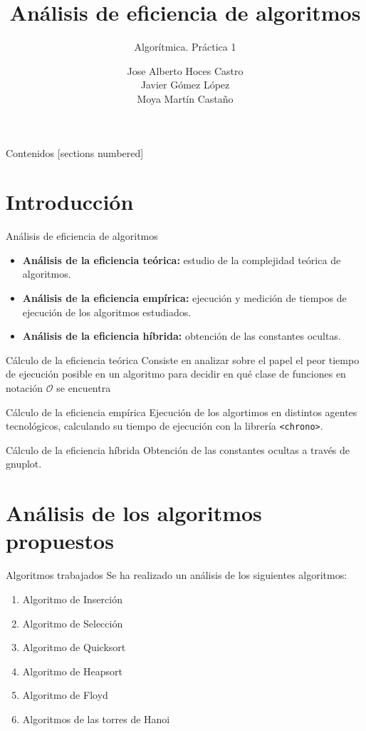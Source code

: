 \documentclass[10pt, xcolor=table]{beamer}
\title{Análisis de eficiencia de algoritmos}
\subtitle{Algorítmica. \alert{Práctica 1}}
\date{}
\author{Jose Alberto Hoces Castro\\Javier Gómez López\\Moya Martín Castaño\\[4pt]}
\begin{document}
\maketitle

\begin{frame}{Contenidos}
	[sections numbered]
	\tableofcontents[]
\end{frame}

\section{Introducción}
\begin{frame}{Análisis de eficiencia de algoritmos}
	\begin{itemize}
		\item \textbf{Análisis de la eficiencia teórica:} estudio de la complejidad teórica de algoritmos.
		\item \textbf{Análisis de la eficiencia empírica:} ejecución y medición de tiempos de ejecución de los algoritmos estudiados.
		\item \textbf{Análisis de la eficiencia híbrida:} obtención de las constantes ocultas.
	\end{itemize}
\end{frame}

\begin{frame}{Cálculo de la eficiencia teórica}
Consiste en analizar sobre el papel el peor tiempo de ejecución posible en un algoritmo para decidir en qué clase de funciones en notación \(\mathcal{O}\) se encuentra
\end{frame}

\begin{frame}{Cálculo de la eficiencia empírica}
Ejecución de los algortimos en distintos agentes tecnológicos, calculando su tiempo de ejecución con la librería \texttt{<chrono>}.
\end{frame}

\begin{frame}{Cálculo de la eficiencia híbrida}
Obtención de las constantes ocultas a través de gnuplot.
\end{frame}

\section{Análisis de los algoritmos propuestos}

\begin{frame}{Algoritmos trabajados}
Se ha realizado un análisis de los siguientes algoritmos:
\begin{enumerate}
	\item Algoritmo de Inserción
	\item Algoritmo de Selección
	\item Algoritmo de Quicksort
	\item Algoritmo de Heapsort
	\item Algoritmo de Floyd
	\item Algoritmos de las torres de Hanoi
\end{enumerate}
\end{frame}
\end{document}
